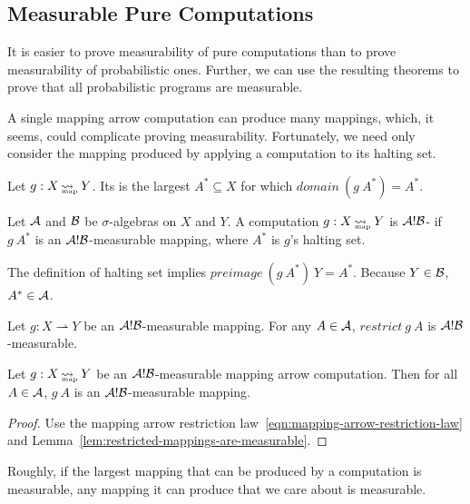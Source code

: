 \documentclass[preprint]{sigplanconf}
\newcommand{\arrow}{\rightsquigarrow}
\newcommand{\pto}{\rightharpoonup}
\newcommand{\map}{_\mathrm{map}}
\DeclareMathOperator{\mapto}{\arrow_{\mspace{-21mu}\map}}
\begin{document}
\subsection{Measurable Pure Computations}

It is easier to prove measurability of pure computations than to prove measurability of probabilistic ones.
Further, we can use the resulting theorems to prove that all probabilistic programs are measurable.

A single mapping arrow computation can produce many mappings, which, it seems, could complicate proving measurability.
Fortunately, we need only consider the mapping produced by applying a computation to its halting set.

\begin{definition}
Let $g : X \mapto Y$. Its  is the largest $A^* \subseteq X$ for which $domain~(g~A^*) = A^*$.
\end{definition}

\begin{definition}
Let $\mathcal{A}$ and $\mathcal{B}$ be $\sigma$-algebras on $X$ and $Y$.
A computation $g : X \mapto Y$ is $\mathcal{A}!\mathcal{B}$- if $g~A^*$ is an $\mathcal{A}!\mathcal{B}$-measurable mapping, where $A^*$ is $g$'s halting set.
\end{definition}

The definition of halting set implies $preimage~(g~A^*)~Y = A^*$.
Because $Y \in \mathcal{B}$, $A^* \in \mathcal{A}$.

\begin{lemma}
Let $g : X \pto Y$ be an $\mathcal{A}!\mathcal{B}$-measurable mapping.
For any $A \in \mathcal{A}$, $restrict~g~A$ is $\mathcal{A}!\mathcal{B}$-measurable.
\label{lem:restricted-mappings-are-measurable}
\end{lemma}

\begin{theorem}
Let $g : X \mapto Y$ be an $\mathcal{A}!\mathcal{B}$-measurable mapping arrow computation.
Then for all $A \in \mathcal{A}$, $g~A$ is an $\mathcal{A}!\mathcal{B}$-measurable mapping.
\label{thm:restricted-computations-are-measurable}
\end{theorem}
\begin{proof}
Use the mapping arrow restriction law~\eqref{eqn:mapping-arrow-restriction-law} and Lemma~\ref{lem:restricted-mappings-are-measurable}.
\end{proof}

Roughly, if the largest mapping that can be produced by a computation is measurable, any mapping it can produce that we care about is measurable.
\end{document}
